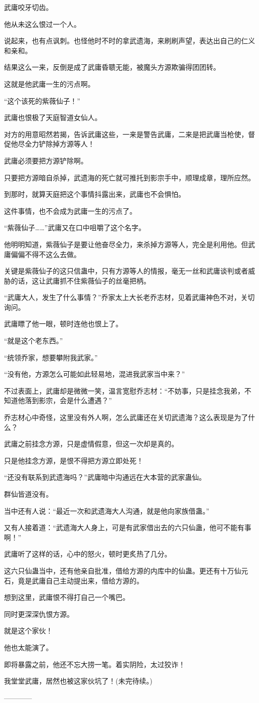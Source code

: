 \begin{this_body}
武庸咬牙切齿。

他从未这么恨过一个人。

说起来，也有点讽刺。也怪他时不时的拿武遗海，来刷刷声望，表达出自己的仁义和亲和。

结果这么一来，反倒是成了武庸昏聩无能，被魔头方源欺骗得团团转。

这就是他武庸一生的污点啊。

“这个该死的紫薇仙子！”

武庸也恨极了天庭智道女仙人。

对方的用意昭然若揭，告诉武庸这些，一来是警告武庸，二来是把武庸当枪使，督促他尽全力铲除掉方源等人！

武庸必须要把方源铲除啊。

只要把方源暗自杀掉，武遗海的死亡就可推托到影宗手中，顺理成章，理所应然。

到那时，就算天庭把这个事情抖露出来，武庸也不会惧怕。

这件事情，也不会成为武庸一生的污点了。

“紫薇仙子……”武庸又在口中咀嚼了这个名字。

他明明知道，紫薇仙子是要让他奋尽全力，来杀掉方源等人，完全是利用他。但武庸偏偏不得不这么去做。

关键是紫薇仙子的这只信蛊中，只有方源等人的情报，毫无一丝和武庸谈判或者威胁的话，这让武庸抓不住紫薇仙子的丝毫把柄。

“武庸大人，发生了什么事情？”乔家太上大长老乔志材，见着武庸神色不对，关切询问。

武庸瞟了他一眼，顿时连他也恨上了。

“就是这个老东西。”

“统领乔家，想要攀附我武家。”

“没有他，方源怎么可能如此轻易地，混进我武家当中来？”

不过表面上，武庸却是微微一笑，温言宽慰乔志材：“不妨事，只是挂念我弟，不知道他落到影宗，会是什么遭遇？”

乔志材心中奇怪，这里没有外人啊，怎么武庸还在关切武遗海？这么表现是为了什么？

武庸之前挂念方源，只是虚情假意，但这一次却是真的。

只是他挂念方源，是恨不得把方源立即处死！

“还没有联系到武遗海吗？”武庸暗中沟通远在大本营的武家蛊仙。

群仙皆道没有。

当中还有人说：“最近一次和武遗海大人沟通，就是他向家族借蛊。”

又有人接着道：“武遗海大人身上，可是有武家借出去的六只仙蛊，他可不能有事啊！”

武庸听了这样的话，心中的怒火，顿时更炙热了几分。

这六只仙蛊当中，还有他亲自批准，借给方源的内库中的仙蛊。更还有十万仙元石，竟是武庸自己主动提出来，借给方源的。

想到这里，武庸恨不得打自己一个嘴巴。

同时更深深仇恨方源。

就是这个家伙！

他也太能演了。

即将暴露之前，他还不忘大捞一笔。着实阴险，太过狡诈！

我堂堂武庸，居然也被这家伙坑了！(未完待续。)

------------

\end{this_body}

